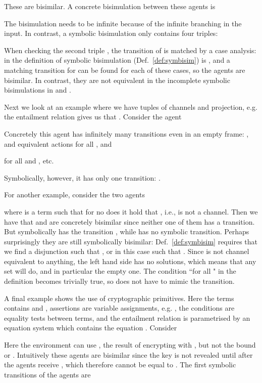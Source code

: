 \documentclass{eptcs}
\theoremstyle{definition}
\begin{document}
These are bisimilar. A concrete bisimulation between these agents is

The bisimulation needs to be infinite because of the infinite branching in the input.
In contrast, a
symbolic bisimulation only contains four triples:


When checking the second triple , the transition of
 is matched by a case analysis:  in the definition of symbolic bisimulation (Def.~\ref{def:symbisim}) is
, and a matching transition for  can be found for each of
these cases, so the agents are bisimilar.
In contrast,
they are not equivalent in the incomplete
symbolic bisimulations in
\cite{borgstroem.briais.ea:symbolic-bisimulation} and
\cite{DBLP:conf/fsttcs/DelauneKR07}.

Next we look at an example where we have tuples of channels and projection,
e.g. the entailment relation gives us that . Consider the agent

Concretely this agent has infinitely many transitions even in an empty frame: , 
\iftrue and equivalent actions  
for all , and
 
for all  and , etc.
\else
and equivalently  
for all , and
 
for all  and , etc.
\fi
Symbolically, however, it has
only one transition: .

For another example, consider the two agents

where  is a term such that for no  does it hold that , i.e.,  is not a channel. Then we have that  and  are concretely bisimilar since
neither one of them has a transition. But symbolically  has the
transition , while
 has no symbolic transition. Perhaps surprisingly they are still symbolically
bisimilar: Def.~\ref{def:symbisim} requires that we find a
disjunction  such that , or in
this case such that . Since  is not channel equivalent to
anything, the left hand side has no solutions, which means that any set
 will do, and in particular the empty one.
The condition ``for all " in the definition becomes
trivially true, so  does not have to mimic the transition.

A final example shows the use of cryptographic primitives. Here
 the terms contains  and ,
assertions are variable assignments, e.g. , the conditions are
equality tests between terms, and the entailment relation is parametrised by an
equation system which contains the equation . Consider

Here the environment can use , the result of encrypting  with , but not the bound  or .
Intuitively these agents are bisimilar since the key  is not revealed until
after the agents receive , which therefore cannot be equal to . The first
symbolic transitions of the agents are
\end{document}
